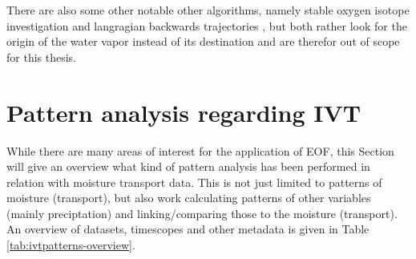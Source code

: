 There are also some other notable other algorithms, namely stable oxygen isotope investigation \cite{ma_atmospheric_nodate} and langragian backwards trajectories \cite{zhao_lagrangian_2021}, but both rather look for the origin of the  water vapor instead of its destination and are therefor out of scope for this thesis.

%
%
%
%
%
%
%
%
%
%

\section{Pattern analysis regarding IVT}
\label{sec:related_pattern_analysis}





While there are many areas of interest for the application of EOF, this Section will give an overview what kind of pattern analysis has been performed in relation with moisture transport data.
This is not just limited to patterns of moisture (transport), but also work calculating patterns of other variables (mainly preciptation) and linking/comparing those to the moisture (transport). 
An overview of datasets, timescopes and other metadata is given in Table \ref{tab:ivtpatterns-overview}.


